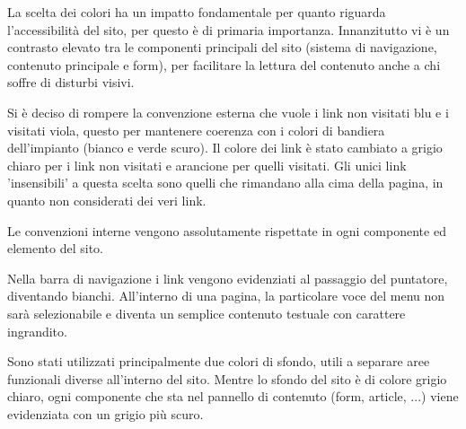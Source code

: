 La scelta dei colori ha un impatto fondamentale per quanto riguarda l'accessibilità del sito, per questo è di primaria importanza. Innanzitutto vi è un contrasto elevato tra le componenti principali del sito (sistema di navigazione, contenuto principale e form), per facilitare la lettura del contenuto anche a chi soffre di disturbi visivi.

Si è deciso di rompere la convenzione esterna che vuole i link non visitati blu e i visitati viola, questo per mantenere coerenza con i colori di bandiera dell'impianto (bianco e verde scuro). Il colore dei link è stato cambiato a grigio chiaro per i link non visitati e arancione per quelli visitati. Gli unici link 'insensibili' a questa scelta sono quelli che rimandano alla cima della pagina, in quanto non considerati dei veri link.

Le convenzioni interne vengono assolutamente rispettate in ogni componente ed elemento del sito.

Nella barra di navigazione i link vengono evidenziati al passaggio del puntatore, diventando bianchi. All'interno di una pagina, la particolare voce del menu non sarà selezionabile e diventa un semplice contenuto testuale con carattere ingrandito.

Sono stati utilizzati principalmente due colori di sfondo, utili a separare aree funzionali diverse all'interno del sito. Mentre lo sfondo del sito è di colore grigio chiaro, ogni componente che sta nel pannello di contenuto (form, article, ...) viene evidenziata con un grigio più scuro.